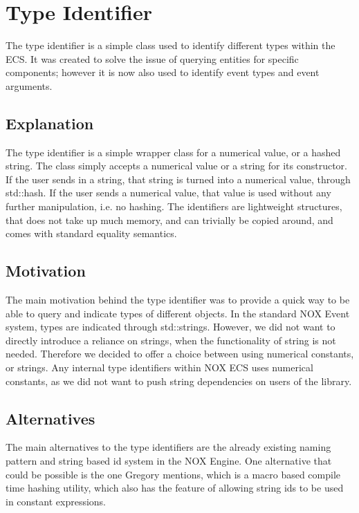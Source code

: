 \section{Type Identifier}
\label{subsec:detailed_type_identifier}
The type identifier is a simple class used to identify different types within
the ECS.
It was created to solve the issue of querying entities for specific components; however it is now also used to identify event types and event arguments.

\subsection{Explanation}
The type identifier is a simple wrapper class for a numerical value, or a hashed string.
The class simply accepts a numerical value or a string for its constructor.
If the user sends in a string, that string is turned into a numerical value, through std::hash. If the user sends a numerical value, that value is used without any further manipulation, i.e. no hashing.
The identifiers are lightweight structures, that does not take up much memory, and can trivially be copied around, and comes with standard equality semantics.

\subsection{Motivation}
The main motivation behind the type identifier was to provide a quick
way to be able to query and indicate types of different objects.
In the standard NOX Event system, types are indicated through std::strings.
However, we did not want to directly introduce a reliance on strings, when the functionality of string is not needed.
Therefore we decided to offer a choice between using numerical constants, or strings.
Any internal type identifiers within NOX ECS uses numerical constants, as we did not want to push string dependencies on users of the library.

\subsection{Alternatives}
The main alternatives to the type identifiers are the already existing
naming pattern and string based id system in the NOX Engine.
One alternative that could be possible is the one Gregory\cite[p. 276]{game_engine_architecture}
mentions, which is a macro based compile time hashing utility,
which also has the feature of allowing string ids to be used in constant expressions.

